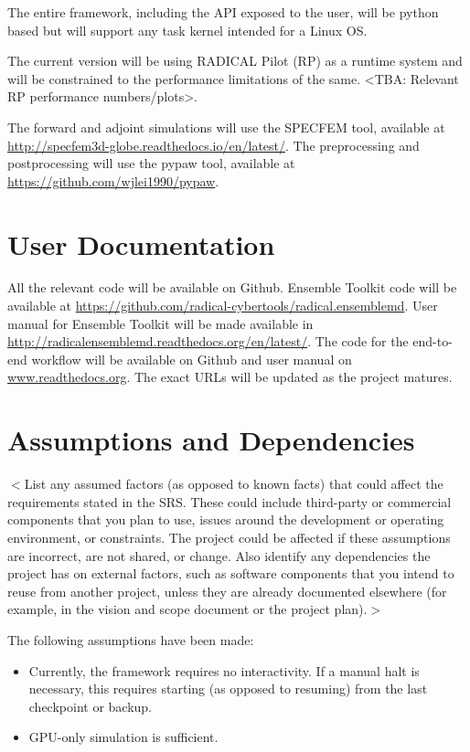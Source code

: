 \documentclass{scrreprt}
\begin{document}
The entire framework, including the API exposed to the user, will be python based but will support any task kernel intended for a Linux OS.

The current version will be using RADICAL Pilot (RP) as a runtime system and will be constrained to the performance limitations of the same. <TBA: Relevant RP performance numbers/plots>.

The forward and adjoint simulations will use the SPECFEM tool, available at \url{http://specfem3d-globe.readthedocs.io/en/latest/}. The preprocessing and postprocessing will use the pypaw tool, available at \url{https://github.com/wjlei1990/pypaw}.

\section{User Documentation}

All the relevant code will be available on Github. Ensemble Toolkit code will be available at \url{https://github.com/radical-cybertools/radical.ensemblemd}. User manual for Ensemble Toolkit will be made available in \url{http://radicalensemblemd.readthedocs.org/en/latest/}. The code for the end-to-end workflow will be available on Github and user manual on \url{www.readthedocs.org}. The exact URLs will be updated as the project matures.

\section{Assumptions and Dependencies}

$<$List any assumed factors (as opposed to known facts) that could affect the 
requirements stated in the SRS. These could include third-party or commercial 
components that you plan to use, issues around the development or operating 
environment, or constraints. The project could be affected if these assumptions 
are incorrect, are not shared, or change. Also identify any dependencies the 
project has on external factors, such as software components that you intend to 
reuse from another project, unless they are already documented elsewhere (for 
example, in the vision and scope document or the project plan).$>$

The following assumptions have been made:
\begin{itemize}[noitemsep]
\item Currently, the framework requires no interactivity. If a manual halt is necessary, this requires starting (as opposed to resuming) from the last checkpoint or backup.
\item GPU-only simulation is sufficient.
\end{itemize}
\end{document}
